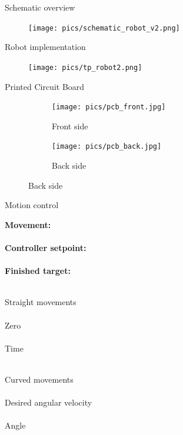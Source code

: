 \documentclass{beamer}
\begin{document}
\begin{frame}{Schematic overview}
	\begin{figure}
		\centering
		\texttt{[image: pics/schematic\_robot\_v2.png]}
	\end{figure}
\end{frame}

\begin{frame}{Robot implementation}
	\begin{figure}
		\centering
		\texttt{[image: pics/tp\_robot2.png]}
	\end{figure}
\end{frame}

\begin{frame}{Printed Circuit Board}
	\vspace{1em}
	\begin{figure}
		\centering
		\begin{subfigure}[b]{0.35\textwidth}
			\texttt{[image: pics/pcb\_front.jpg]}
			\caption*{Front side}
		\end{subfigure}
		\qquad
		\begin{subfigure}[b]{0.35\textwidth}
			\texttt{[image: pics/pcb\_back.jpg]}
			\caption*{Back side}
		\end{subfigure}
	\end{figure}
\end{frame}


\begin{frame}{Motion control}
	\begin{minipage}{0.30\textwidth}%
		\textbf{Movement:} \\\\
		
		\textbf{Controller setpoint:} \\\\
		
		\textbf{Finished target:} \\\\
	
	\end{minipage}
	\begin{minipage}{0.32\textwidth}
		Straight movements \\\\
		
		Zero \\\\
		
		Time \\\\
		
	\end{minipage}
	\begin{minipage}{0.34\textwidth}%
		Curved movements \\\\
		
		Desired angular velocity \\\\
		
		Angle \\\\
		
	\end{minipage}
\end{frame}
\end{document}
